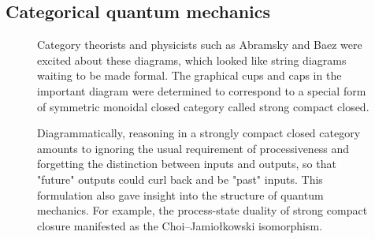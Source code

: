 \subsection{Categorical quantum mechanics}

\begin{figure}[h!]
\centering
{}
\caption{Category theorists and physicists such as Abramsky and Baez were excited about these diagrams, which looked like string diagrams waiting to be made formal. The graphical cups and caps in the important diagram were determined to correspond to a special form of symmetric monoidal closed category called strong compact closed.}
\end{figure}

\begin{figure}[h!]
\centering
{}
\caption{Diagrammatically, reasoning in a strongly compact closed category amounts to ignoring the usual requirement of processiveness and forgetting the distinction between inputs and outputs, so that "future" outputs could curl back and be "past" inputs. This formulation also gave insight into the structure of quantum mechanics. For example, the process-state duality of strong compact closure manifested as the Choi–Jamiołkowski isomorphism.}
\end{figure}


